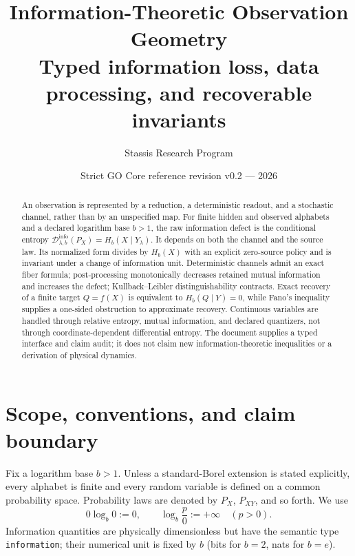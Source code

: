 \documentclass[11pt,a4paper]{article}
\title{\bfseries Information-Theoretic Observation Geometry\\
\large Typed information loss, data processing, and recoverable invariants}
\author{Stassis Research Program}
\date{Strict GO Core reference revision v0.2 --- 2026}
\theoremstyle{definition}
\theoremstyle{plain}
\theoremstyle{remark}
\newcommand{\1}{\mathbf{1}}
\newcommand{\Hb}{H_b}
\newcommand{\Dinfo}{\mathscr{D}^{\mathrm{info}}}
\begin{document}
\maketitle

\begin{center}
\end{center}

\begin{abstract}
An observation is represented by a reduction, a deterministic readout, and
a stochastic channel, rather than by an unspecified map. For finite hidden
and observed alphabets and a declared logarithm base $b>1$, the raw
information defect is the conditional entropy
$\Dinfo_{\lambda,b}(P_X)=\Hb(X\mid Y_\lambda)$. It depends on both the
channel and the source law. Its normalized form divides by $\Hb(X)$ with
an explicit zero-source policy and is invariant under a change of
information unit. Deterministic channels admit an exact fiber formula;
post-processing monotonically decreases retained mutual information and
increases the defect; Kullback--Leibler distinguishability contracts.
Exact recovery of a finite target $Q=f(X)$ is equivalent to
$\Hb(Q\mid Y)=0$, while Fano's inequality supplies a one-sided obstruction
to approximate recovery. Continuous variables are handled through relative
entropy, mutual information, and declared quantizers, not through
coordinate-dependent differential entropy. The document supplies a typed
interface and claim audit; it does not claim new information-theoretic
inequalities or a derivation of physical dynamics.
\end{abstract}

\tableofcontents

\section{Scope, conventions, and claim boundary}

Fix a logarithm base $b>1$. Unless a standard-Borel extension is stated
explicitly, every alphabet is finite and every random variable is defined
on a common probability space. Probability laws are denoted by $P_X$,
$P_{XY}$, and so forth. We use
\[
0\log_b 0:=0,
\qquad
\log_b\frac{p}{0}:=+\infty\quad (p>0).
\]
Information quantities are physically dimensionless but have the semantic
type \texttt{information}; their numerical unit is fixed by $b$ (bits for
$b=2$, nats for $b=e$).
\end{document}
